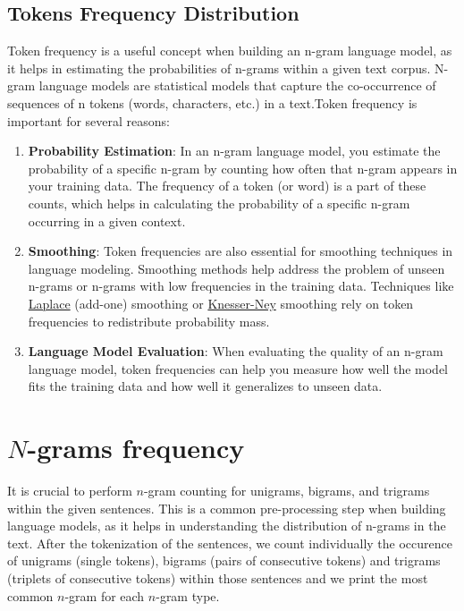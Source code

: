\documentclass[11pt,onside]{article}
\begin{document}
\begin{enumerate}
\subsection*{Tokens Frequency Distribution}
Token frequency is a useful concept when building an n-gram language model, as it helps in estimating the probabilities of n-grams within a given text corpus. N-gram language models are statistical models that capture the co-occurrence of sequences of n tokens (words, characters, etc.) in a text.Token frequency is important for several reasons: 
\begin{enumerate}
    \item \textbf{Probability Estimation}: In an n-gram language model, you estimate the probability of a specific n-gram by counting how often that n-gram appears in your training data. The frequency of a token (or word) is a part of these counts, which helps in calculating the probability of a specific n-gram occurring in a given context. 
    \item \textbf{Smoothing}: Token frequencies are also essential for smoothing techniques in language modeling. Smoothing methods help address the problem of unseen n-grams or n-grams with low frequencies in the training data. Techniques like \href{https://en.wikipedia.org/wiki/Additive_smoothing}{Laplace} (add-one) smoothing or \href{https://en.wikipedia.org/wiki/Kneser–Ney_smoothing}{Knesser-Ney} smoothing rely on token frequencies to redistribute probability mass. 
    \item \textbf{Language Model Evaluation}: When evaluating the quality of an n-gram language model, token frequencies can help you measure how well the model fits the training data and how well it generalizes to unseen data. 
\end{enumerate}

\section*{\(N\)-grams frequency}

It is crucial to perform \(n\)-gram counting for unigrams, bigrams, and trigrams within the given sentences. This is a common pre-processing step when building language models, as it helps in understanding the distribution of n-grams in the text. After the tokenization of the sentences, we count individually the occurence of unigrams (single tokens), bigrams (pairs of consecutive tokens) and trigrams (triplets of consecutive tokens) within those sentences and we print the most common \(n\)-gram for each \(n\)-gram type.


\end{enumerate}
\end{document}
